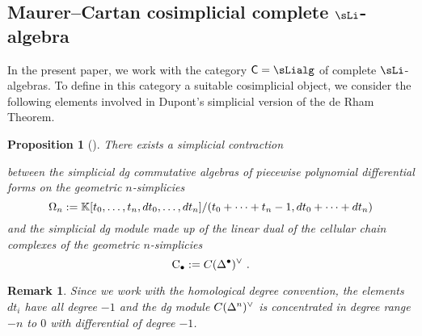 \documentclass[twoside, 10pt]{amsart}
\newtheorem{remark}[lemma]{Remark}
\newtheorem{proposition}[lemma]{Proposition}
\begin{document}

\subsection{Maurer--Cartan cosimplicial complete $\sLi$-algebra}

In the present paper, we work with the  category $\mathsf{C}=\sLialg$ of complete $\sLi$-algebras. To define in this category a suitable cosimplicial object, we consider the following elements involved in Dupont's simplicial version of  the de Rham Theorem. 

\begin{proposition}[{\cite{Dupont76}}]
There exists a simplicial contraction 
\begin{center}
\end{center}
between the simplicial dg commutative algebras of piecewise polynomial differential forms on the geometric $n$-simplicies 
\[
\Omega_n:=\mathbb{K}[t_0, \ldots, t_n, d t_0, \ldots, d t_n]/(t_0+\cdots+t_n-1, d t_0+\cdots+ d t_n)
\]
and the simplicial dg module made up of the linear dual of the cellular chain complexes of the geometric $n$-simplicies 
\[\mathrm{C}_\bullet:=C(\De{\bullet})^\vee\ .\]
\end{proposition}

\begin{remark}
Since we work with the homological degree convention, the elements $d t_i$ have all degree $-1$ and the dg module $C(\mathrm{\Delta}^{n})^\vee$ is concentrated in degree range $-n$ to $0$ with differential of degree $-1$. 
\end{remark}
\end{document}
